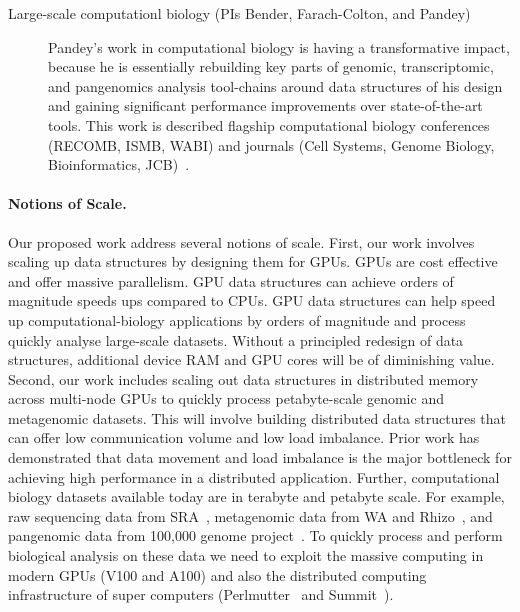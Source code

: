 \begin{description}
    \item[Large-scale computationl biology (PIs Bender, Farach-Colton, and Pandey)] Pandey's work in computational biology is having a transformative impact, because he is essentially rebuilding key parts of genomic, transcriptomic, and pangenomics analysis tool-chains around data structures of his design and gaining significant performance improvements over state-of-the-art tools. This work is described flagship computational biology conferences (RECOMB, ISMB, WABI) and journals (Cell Systems, Genome Biology, Bioinformatics, JCB)~\cite{PandeyABFJP18Cell,PandeyBJP17a,PandeyBJP17b,AlmodaresiPFJP19,AlmodaresiPFJP20,pandey2021variantstore,almodaresi2017rainbowfish,almodaresi2022incrementally}.

\end{description}


\paragraph{Notions of Scale.}
Our proposed work address several notions of scale.
First, our work involves scaling up data structures by designing them for GPUs. GPUs are cost effective and offer massive parallelism. GPU data structures can achieve orders of magnitude speeds ups compared to CPUs. GPU data structures can help speed up computational-biology applications by orders of magnitude and process quickly analyse large-scale datasets. Without a principled redesign of data structures, additional device RAM and GPU cores will be of diminishing value.
Second, our work includes scaling out data structures in distributed memory across multi-node GPUs to quickly process petabyte-scale genomic and metagenomic datasets. This will involve building distributed data structures that can offer low communication volume and low load imbalance. Prior work has demonstrated that data movement and load imbalance is the major bottleneck for achieving high performance in a distributed application.
Further, computational biology datasets available today are in terabyte and petabyte scale. For example, raw sequencing data from SRA~\cite{kodama2012sequence}, metagenomic data from WA and Rhizo~\cite{hofmeyr2020terabase}, and pangenomic data from 100,000 genome project~\cite{1002021100}. To quickly process and perform biological analysis on these data we need to exploit the massive computing in modern GPUs (V100 and A100) and also the distributed computing infrastructure of super computers (Perlmutter~\cite{perlmutter} and Summit~\cite{summit}).
